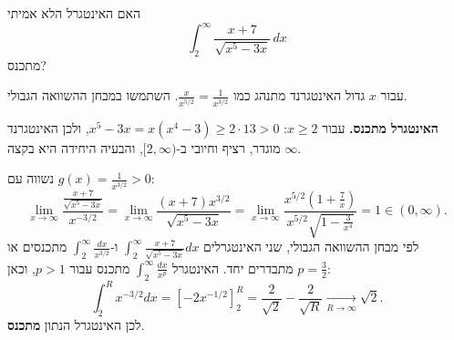 
\begin{question}
האם האינטגרל הלא אמיתי
\[ \int_2^\infty\frac{x+7}{\sqrt{x^5-3x}}\,dx \]
מתכנס?
\end{question}

\begin{hint}
עבור $x$ גדול האינטגרנד מתנהג כמו $\frac{x}{x^{5/2}}=\frac{1}{x^{3/2}}$. השתמשו במבחן ההשוואה הגבולי.
\end{hint}

\begin{solution}
\textbf{האינטגרל מתכנס.}
עבור $x\ge2$: $x^5-3x=x(x^4-3)\ge2\cdot13>0$, ולכן האינטגרנד מוגדר, רציף וחיובי ב-$[2,\infty)$, והבעיה היחידה היא בקצה $\infty$.

נשווה עם $g(x)=\frac{1}{x^{3/2}}>0$:
\[ \lim_{x\to\infty}\frac{\frac{x+7}{\sqrt{x^5-3x}}}{x^{-3/2}}=\lim_{x\to\infty}\frac{(x+7)x^{3/2}}{\sqrt{x^5-3x}}=\lim_{x\to\infty}\frac{x^{5/2}\left(1+\frac7x\right)}{x^{5/2}\sqrt{1-\frac{3}{x^4}}}=1\in(0,\infty). \]
לפי מבחן ההשוואה הגבולי, שני האינטגרלים $\int_2^\infty\frac{x+7}{\sqrt{x^5-3x}}dx$ ו-$\int_2^\infty\frac{dx}{x^{3/2}}$ מתכנסים או מתבדרים יחד. האינטגרל $\int_2^\infty\frac{dx}{x^p}$ מתכנס עבור $p>1$, וכאן $p=\frac32$:
\[ \int_2^R x^{-3/2}dx=\left[-2x^{-1/2}\right]_2^R=\frac{2}{\sqrt2}-\frac{2}{\sqrt R}\xrightarrow[R\to\infty]{}\sqrt2. \]
לכן האינטגרל הנתון \textbf{מתכנס}.
\end{solution}
